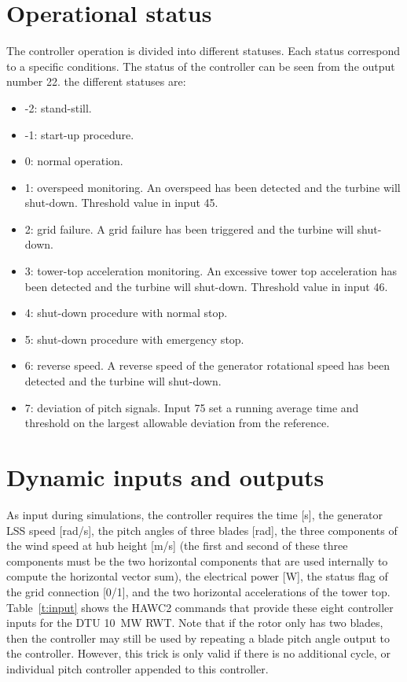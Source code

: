 \clearpage


\section{Operational status} \label{s:status}
The controller operation is divided into different statuses. Each status correspond to a specific conditions. The status of the controller can be seen from the output number 22.
the different statuses are:
\begin{itemize}
\item -2: stand-still.
\item -1: start-up procedure.
\item 0: normal operation.
\item 1: overspeed monitoring. An overspeed has been detected and the turbine will shut-down. Threshold value in input 45.
\item 2: grid failure. A grid failure has been triggered and the turbine will shut-down.
\item 3: tower-top acceleration monitoring. An excessive tower top acceleration has been detected and the turbine will shut-down. Threshold value in input 46.
\item 4: shut-down procedure with normal stop.
\item 5: shut-down procedure with emergency stop.
\item 6: reverse speed. A reverse speed of the generator rotational speed has been detected and the turbine will shut-down.
\item 7: deviation of pitch signals. Input 75 set a running average time and threshold on the largest allowable deviation from the reference.
\end{itemize} 

\section{Dynamic inputs and outputs}

As input during simulations, the controller requires the time [s], the generator LSS speed [rad/s], the pitch angles of three blades [rad], the three components of the wind speed at hub height [m/s] (the first and second of these three components must be the two horizontal components that are used internally to compute the horizontal vector sum), the electrical power [W], the status flag of the grid connection [0/1], and the two horizontal accelerations of the tower top. Table~\ref{t:input} shows the HAWC2 commands that provide these eight controller inputs for the DTU 10~MW RWT. Note that if the rotor only has two blades, then the controller may still be used by repeating a blade pitch angle output to the controller. However, this trick is only valid if there is no additional cycle, or individual pitch controller appended to this controller.

